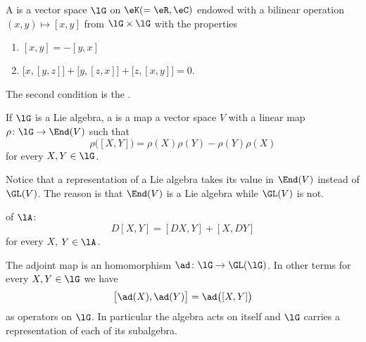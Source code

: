 
\begin{definition}      \label{DEFooVBPKooGxlDBn}
	A  is a vector space \( \lG\) on \( \eK(=\eR,\eC)\) endowed with a bilinear operation \( (x,y)\mapsto [x,y]\) from \( \lG\times\lG\) with the properties
	\begin{enumerate}
		\item
		      \( [x,y]=-[y,x]\)
		\item
		      \( \big[ x,[y,z] \big]+\big[ y,[z,x] \big]+\big[ z,[x,y] \big]=0\).
	\end{enumerate}
	The second condition is the .
\end{definition}

\begin{definition}     \label{DEFooHINCooYoxPFj}
	If \( \lG\) is a Lie algebra, a  is a map a vector space \( V\) with a linear map \( \rho\colon \lG\to \End(V)\) such that
	\begin{equation}
		\rho\big( [X,Y] \big)=\rho(X)\rho(Y)-\rho(Y)\rho(X)
	\end{equation}
	for every \( X,Y\in \lG\).

	Notice that a representation of a Lie algebra takes its value in \( \End(V)\) instead of \( \GL(V)\). The reason is that \( \End(V)\) is a Lie algebra while \( \GL(V)\) is not.
\end{definition}

\begin{definition}      \label{DEFooDUEUooZLhKdv}
	 of $\lA$:
	\begin{equation}
		D[X,Y]=[DX,Y]+[X,DY]
	\end{equation}
	for every $X$, $Y\in\lA$.
\end{definition}

\begin{lemma}       \label{LemadhomomadXadYadXY}
	The adjoint map is an homomorphism \( \ad\colon \lG\to \GL(\lG)\). In other terms for every \( X,Y\in\lG\) we have
	\begin{equation}
		\big[ \ad(X),\ad(Y) \big]=\ad\big( [X,Y] \big)
	\end{equation}
	as operators on \( \lG\). In particular the algebra acts on itself and \( \lG\) carries a representation of each of its subalgebra.
\end{lemma}

